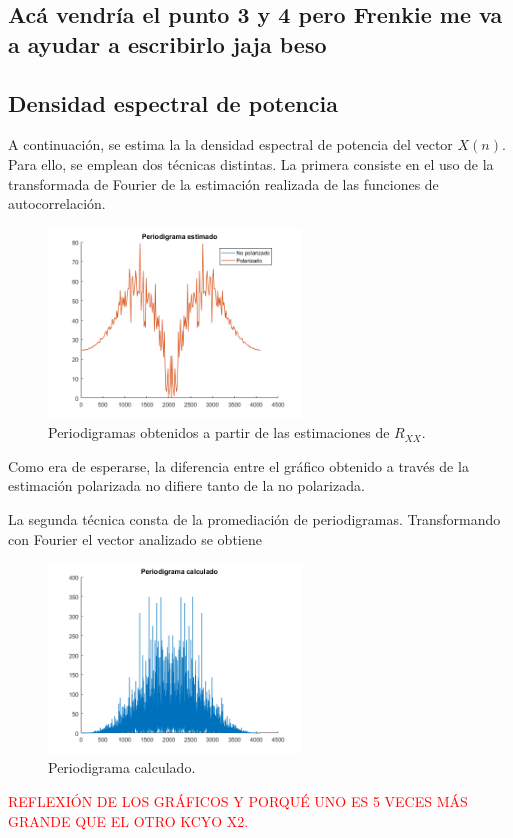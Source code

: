 \subsection{Acá vendría el punto 3 y 4 pero Frenkie me va a ayudar a escribirlo jaja beso}

\subsection{Densidad espectral de potencia}

A continuación, se estima la la densidad espectral de potencia del vector $X(n)$. Para ello, se emplean dos técnicas distintas. La primera consiste en el uso de la transformada de Fourier de la estimación realizada de las funciones de autocorrelación.
\begin{figure}[H]
\centering
	\includegraphics[width=0.6\textwidth, trim = {0 0 0 0.725cm},clip]{./ImagenesEjercicio2/period-est.png}
	\caption{Periodigramas obtenidos a partir de las estimaciones de $R_{XX}$.}
	\label{fig:period-est}
\end{figure}

Como era de esperarse, la diferencia entre el gráfico obtenido a través de la estimación polarizada no difiere tanto de la no polarizada.

La segunda técnica consta de la promediación de periodigramas. Transformando con Fourier el vector analizado se obtiene
\begin{figure}[H]
\centering
	\includegraphics[width=0.6\textwidth, trim = {0 0 0 0.725cm},clip]{./ImagenesEjercicio2/period-calc.png}
	\caption{Periodigrama calculado.}
	\label{fig:period-calc}
\end{figure}

\textcolor{red}{REFLEXIÓN DE LOS GRÁFICOS Y PORQUÉ UNO ES 5 VECES MÁS GRANDE QUE EL OTRO KCYO X2.}


